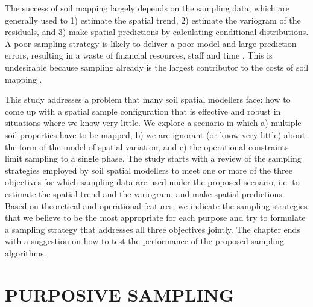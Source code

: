 The success of soil mapping largely depends on the sampling data, which are generally used to 1) estimate the 
spatial trend, 2) estimate the variogram of the residuals, and 3) make spatial predictions by calculating 
conditional distributions. A poor sampling strategy is likely to deliver a poor model and large prediction 
errors, resulting in a waste of financial resources, staff and time \cite{vanGroenigenEtAl1999,  
deGruijterEtAl2006, LanEtAl2010}. This is undesirable because sampling already is the largest contributor to 
the costs of soil mapping \cite{WebsterEtAl1990, vanGroenigenEtAl1999, KempenEtAl2012}.

This study addresses a problem that many soil spatial modellers face: how to come up with a spatial sample 
configuration that is effective and robust in situations where we know very little. We explore a scenario in 
which a) multiple soil properties have to be mapped, b) we are ignorant (or know very little) about the form of 
the model of spatial variation, and c) the operational constraints limit sampling to a single phase. The study 
starts with a review of the sampling strategies employed by soil spatial modellers to meet one or more of the 
three objectives for which sampling data are used under the proposed scenario, i.e. to estimate the spatial 
trend and the variogram, and make spatial predictions. Based on theoretical and operational features, we 
indicate the sampling strategies that we believe to be the most appropriate for each purpose and try to 
formulate a sampling strategy that addresses all three objectives jointly. The chapter ends with a suggestion 
on how to test the performance of the proposed sampling algorithms.


\section{PURPOSIVE SAMPLING}


